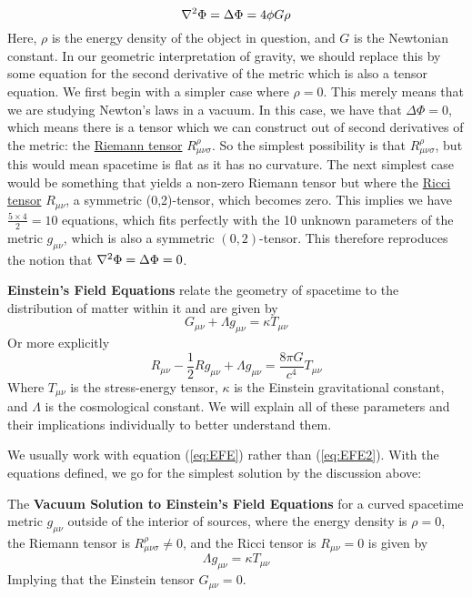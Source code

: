 \documentclass{article}
\begin{document}
 		\begin{equation}
 			\label{eq:NewtonGravityField}
 			\nabla^2 \Phi = \Delta \Phi = 4 \phi G \rho
 		\end{equation}
 		Here, $\rho$ is the energy density of the object in question, and $G$ is the Newtonian constant. In our geometric interpretation of gravity, we should replace this by some equation for the second derivative of the metric which is also a tensor equation. We first begin with a simpler case where $\rho=0$. This merely means that we are studying Newton's laws in a vacuum. In this case, we have that $\Delta \Phi = 0$, which means there is a tensor which we can construct out of second derivatives of the metric: the \hyperref[eq:RiemannTensor]{Riemann tensor} $R^\rho_{\mu\nu\sigma}$. So the simplest possibility is that $R_{\mu\nu\sigma}^\rho$, but this would mean spacetime is flat as it has no curvature. The next simplest case would be something that yields a non-zero Riemann tensor but where the \hyperref[eq:RicciTensor]{Ricci tensor} $R_{\mu\nu}$, a symmetric (0,2)-tensor, which becomes zero. This implies we have $\frac{5\times4}{2} = 10$ equations, which fits perfectly with the 10 unknown parameters of the metric $g_{\mu\nu}$, which is also a symmetric $(0,2)$-tensor. This therefore reproduces the notion that $\nabla^2 \Phi = \Delta \Phi = 0$.
 		\begin{defn}
 			\textbf{Einstein's Field Equations} relate the geometry of spacetime to the distribution of matter within it and are given by
 			\begin{equation}
 				\label{eq:EFE}
 				\boxed{G_{\mu\nu} + \Lambda g_{\mu\nu} = \kappa T_{\mu\nu}}
 			\end{equation}
 			Or more explicitly
 			\begin{equation}
 				\label{eq:EFE2}
 				\boxed{R_{\mu\nu} -\frac12 R g_{\mu\nu} + \Lambda g_{\mu\nu} = \frac{8\pi G}{c^4} T_{\mu\nu}}
 			\end{equation}
 			Where $T_{\mu\nu}$ is the stress-energy tensor, $\kappa$ is the Einstein gravitational constant, and $\Lambda$ is the cosmological constant. We will explain all of these parameters and their implications individually to better understand them.
 		\end{defn}
 		We usually work with equation (\ref{eq:EFE}) rather than (\ref{eq:EFE2}). With the equations defined, we go for the simplest solution by the discussion above:
 		\pagebreak
 		\begin{defn}
 			
 			The \textbf{Vacuum Solution to Einstein's Field Equations} for a curved spacetime metric $g_{\mu\nu}$ outside of the interior of sources, where the energy density is $\rho=0$, the Riemann tensor is $R^\rho_{\mu\nu\sigma}\neq 0$, and the Ricci tensor is $R_{\mu\nu} = 0$ is given by
 			\begin{equation}
 				\label{eq:EFE-vacuum}
 				\Lambda g_{\mu\nu} = \kappa T_{\mu\nu}
 			\end{equation}
 			Implying that the Einstein tensor $G_{\mu\nu}=0$.
 		\end{defn}
\end{document}
